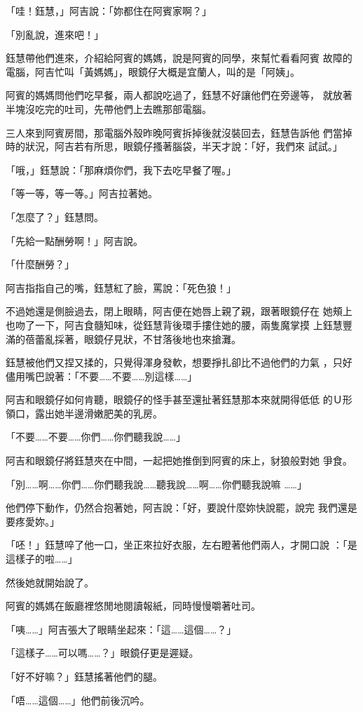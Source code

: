 「哇！鈺慧，」阿吉說：「妳都住在阿賓家啊？」

「別亂說，進來吧！」

鈺慧帶他們進來，介紹給阿賓的媽媽，說是阿賓的同學，來幫忙看看阿賓
故障的電腦，阿吉忙叫「黃媽媽」，眼鏡仔大概是宜蘭人，叫的是「阿姨」。

阿賓的媽媽問他們吃早餐，兩人都說吃過了，鈺慧不好讓他們在旁邊等，
就放著半塊沒吃完的吐司，先帶他們上去瞧那部電腦。

三人來到阿賓房間，那電腦外殼昨晚阿賓拆掉後就沒裝回去，鈺慧告訴他
們當掉時的狀況，阿吉若有所思，眼鏡仔搔著腦袋，半天才說：「好，我們來
試試。」

「哦，」鈺慧說：「那麻煩你們，我下去吃早餐了喔。」

「等一等，等一等。」阿吉拉著她。

「怎麼了？」鈺慧問。

「先給一點酬勞啊！」阿吉說。

「什麼酬勞？」

阿吉指指自己的嘴，鈺慧紅了臉，罵說：「死色狼！」

不過她還是側臉過去，閉上眼睛，阿吉便在她唇上親了親，跟著眼鏡仔在
她頰上也吻了一下，阿吉食髓知味，從鈺慧背後環手摟住她的腰，兩隻魔掌摸
上鈺慧豐滿的蓓蕾亂採著，眼鏡仔見狀，不甘落後地也來搶灘。

鈺慧被他們又捏又揉的，只覺得渾身發軟，想要掙扎卻比不過他們的力氣
，只好儘用嘴巴說著：「不要……不要……別這樣……」

阿吉和眼鏡仔如何肯聽，眼鏡仔的怪手甚至還扯著鈺慧那本來就開得低低
的Ｕ形領口，露出她半邊滑嫩肥美的乳房。

「不要……不要……你們……你們聽我說……」

阿吉和眼鏡仔將鈺慧夾在中間，一起把她推倒到阿賓的床上，豺狼般對她
爭食。

「別……啊……你們……你們聽我說……聽我說……啊……你們聽我說嘛
……」

他們停下動作，仍然合抱著她，阿吉說：「好，要說什麼妳快說罷，說完
我們還是要疼愛妳。」

「呸！」鈺慧啐了他一口，坐正來拉好衣服，左右瞪著他們兩人，才開口說
：「是這樣子的啦……」

然後她就開始說了。

阿賓的媽媽在飯廳裡悠閒地閱讀報紙，同時慢慢嚼著吐司。

「咦……」阿吉張大了眼睛坐起來：「這……這個……？」

「這樣子……可以嗎……？」眼鏡仔更是遲疑。

「好不好嘛？」鈺慧搖著他們的腿。

「唔……這個……」他們前後沉吟。

